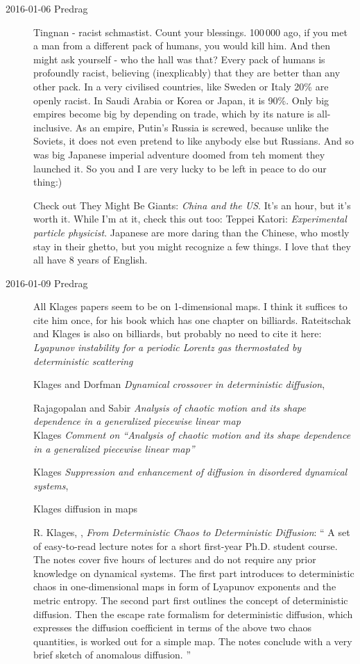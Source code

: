 \begin{description}
\item[2016-01-06 Predrag]
Tingnan - racist schmastist. Count your blessings. 100\,000 ago, if you
met a man from a different pack of humans, you would kill him. And then
might ask yourself - who the hall was that? Every pack of humans is
profoundly racist, believing (inexplicably) that they are better than any
other pack. In a very civilised countries, like Sweden or Italy 20\% are
openly racist. In Saudi Arabia or Korea or Japan, it is 90\%. Only big
empires become big by depending on trade, which by its nature is
all-inclusive. As an empire, Putin's Russia is screwed, because unlike
the Soviets, it does not even pretend to like anybody else but Russians.
And so was big Japanese imperial adventure doomed from teh moment they
launched it. So you and I are very lucky to be left in peace to do our
thing:)

Check out
 {They Might Be Giants}:
\emph{China and the US}. It's an hour, but it's worth it. While I'm at it,
check this out too:
{Teppei Katori}: \emph{Experimental particle physicist}.
Japanese are more daring than the Chinese, who mostly stay in their
ghetto, but you might recognize a few things. I love that they all have 8
years of English.

\item[2016-01-09 Predrag]
All Klages papers seem to be on 1-dimensional maps. I think it suffices
to cite him once, for his book which has one chapter on
billiards. Rateitschak and Klages is also on billiards, but
probably no need to cite it here:
   {\em Lyapunov instability for a periodic {Lorentz} gas thermostated by
   deterministic scattering}

Klages and Dorfman
 {\em Dynamical crossover in deterministic diffusion},

Rajagopalan and Sabir {\em Analysis of chaotic motion and its
shape dependence in a generalized piecewise linear map}
\\
Klages
   {\em Comment on ``Analysis of chaotic motion and its shape dependence
   in a generalized piecewise linear map''}

Klages
   {\em Suppression and enhancement of diffusion in disordered dynamical systems},

Klages diffusion in maps

R. Klages, ,
{\em From Deterministic Chaos to Deterministic Diffusion}: ``
A set of easy-to-read lecture notes for a short first-year Ph.D.
student course. The notes cover five hours of lectures and
do not require any prior knowledge on dynamical systems. The first part introduces
to deterministic chaos in one-dimensional maps in form of Lyapunov exponents
and the metric entropy. The second part first outlines the concept of
deterministic diffusion. Then the escape rate formalism for deterministic
diffusion, which expresses the diffusion coefficient in terms of the above two
chaos quantities, is worked out for a simple map. The notes conclude with a
very brief sketch of anomalous diffusion.
''


\end{description}
